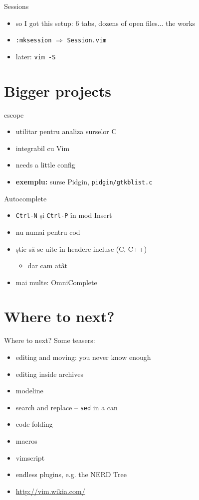 \documentclass{beamer}
\begin{document}
\begin{frame}{Sessions}
  \begin{itemize}
    \item so I got this setup: 6 tabs, dozens of open files... the works
    \item \texttt{:mksession} $\Rightarrow$ \texttt{Session.vim}
    \item later: \texttt{vim -S}
  \end{itemize}
\end{frame}

\section{Bigger projects}
\begin{frame}{cscope}
  \begin{itemize}
    \item utilitar pentru analiza surselor C
    \item integrabil cu Vim
    \item needs a little config
    \pause
    \item \textbf{exemplu:} surse Pidgin, \texttt{pidgin/gtkblist.c}
  \end{itemize}
\end{frame}

\begin{frame}{Autocomplete}
  \begin{itemize}
    \item \texttt{Ctrl-N} și \texttt{Ctrl-P} în mod Insert
    \item nu numai pentru cod
    \item știe să se uite în headere incluse (C, C++)
    \pause
      \begin{itemize}
        \item dar cam atât
      \end{itemize}
    \pause
    \item mai multe: OmniComplete
  \end{itemize}
\end{frame}

\section{Where to next?}
\begin{frame}{Where to next?}
  Some teasers:
  \begin{itemize}
    \item editing and moving: you never know enough
    \item editing inside archives
    \item modeline
    \item search and replace -- \texttt{sed} in a can
    \item code folding
    \item macros
    \item vimscript
    \item endless plugins, e.g. the NERD Tree
    \item \url{http://vim.wikia.com/}
  \end{itemize}
\end{frame}
\end{document}
